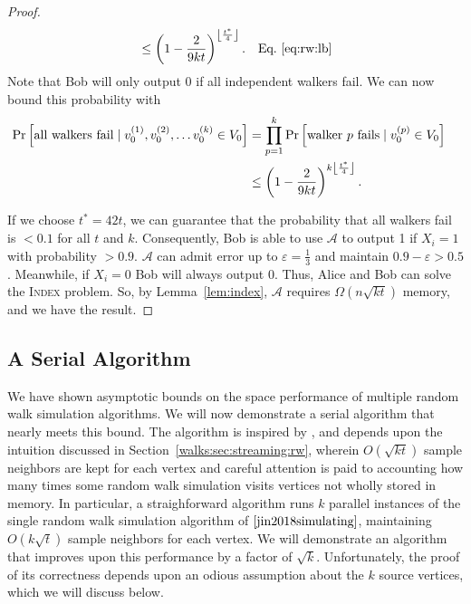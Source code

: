 \documentclass[10]{report}
\newcommand{\algoname}[1]{\textnormal{\textsc{#1}}}
\begin{document}
\begin{proof}
\begin{align*}
&\leq
\left ( 1 - \frac{2}{9kt} \right ) ^ {\left \lfloor \frac{t^*}{4} \right \rfloor}.
& \textnormal{Eq.~\eqref{eq:rw:lb}}
\end{align*}
%
Note that Bob will only output 0 if all independent walkers fail. 
We can now bound this probability with 
%
\begin{align*}
\Pr \left [ \textnormal{all walkers fail} \mid v_0^{(1)}, v_0^{(2)}, \dots v_0^{(k)} \in V_0 \right ]
&=
\prod\limits_{p=1}^{k} \Pr \left [ \textnormal{walker $p$ fails} \mid v_0^{(p)} \in V_0 \right ]
&
\\
&\leq
\left ( 1 - \frac{2}{9kt} \right ) ^ {k\left \lfloor \frac{t^*}{4} \right \rfloor}.
&
\end{align*}
%

If we choose $t^* = 42 t$, we can guarantee that the probability that all walkers fail is $< 0.1$ for all $t$ and $k$. 
Consequently, Bob is able to use $\mathcal{A}$ to output 1 if $X_i = 1$ with probability $> 0.9$. 
$\mathcal{A}$ can admit error up to $\varepsilon = \frac{1}{3}$ and maintain $0.9 - \varepsilon > 0.5$.
Meanwhile, if $X_i = 0$ Bob will always output $0$.
Thus, Alice and Bob can solve the \algoname{Index} problem.
So, by Lemma~\ref{lem:index}, $\mathcal{A}$ requires $\Omega(n\sqrt{kt})$ memory, and we have the result.
\end{proof}


\subsection{A Serial Algorithm}
 \label{walks:sec:walks:serial}



We have shown asymptotic bounds on the space performance of multiple random walk simulation algorithms.
We will now demonstrate a serial algorithm that nearly meets this bound.
The algorithm is inspired by \cite{jin2018simulating}, and depends upon the intuition discussed in Section~\ref{walks:sec:streaming:rw}, wherein $O(\sqrt{kt})$ sample neighbors are kept for each vertex and careful attention is paid to accounting how many times some random walk simulation visits vertices not wholly stored in memory.
In particular, a straighforward algorithm runs $k$ parallel instances of the single random walk simulation algorithm of $\cite{jin2018simulating}$, maintaining $O(k\sqrt{t})$ sample neighbors for each vertex.
We will demonstrate an algorithm that improves upon this performance by a factor of $\sqrt{k}$.
Unfortunately, the proof of its correctness depends upon an odious assumption about the $k$ source vertices, which we will discuss below.
\end{document}
